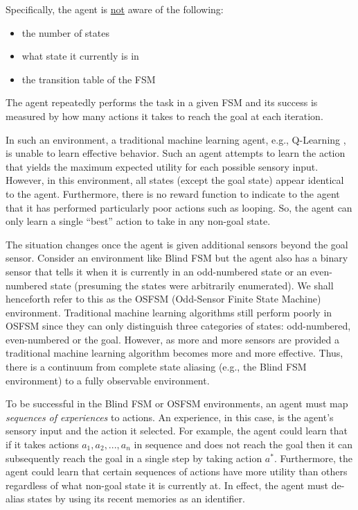 \documentclass[letterpaper]{article} %
\begin{document}
\bigskip  %

Specifically, the agent is \underline{not} aware of the following:
\begin{itemize}
\item the number of states
\item what state it currently is in
\item the transition table of the FSM
\end{itemize}

\noindent The agent repeatedly performs the task in a given FSM and its success
is measured by how many actions it takes to reach the goal at each
iteration.  

In such an environment, a traditional machine learning agent, e.g.,
Q-Learning \cite{Sutton98}, is unable to learn effective behavior.
Such an agent attempts to learn the action that yields the maximum
expected utility for each possible sensory input.  However, in this
environment, all states (except the goal state) appear identical to
the agent. Furthermore, there is no reward function to indicate to the
agent that it has performed particularly poor actions such as
looping. So, the agent can only learn a single ``best'' action to take
in any non-goal state.

The situation changes once the agent is given additional sensors
beyond the goal sensor.  Consider an environment like Blind FSM but
the agent also has a binary sensor that tells it when it is currently
in an odd-numbered state or an even-numbered state (presuming the
states were arbitrarily enumerated).  We shall henceforth refer to
this as the OSFSM (Odd-Sensor Finite State Machine)
environment. Traditional machine learning algorithms still perform
poorly in OSFSM since they can only distinguish three categories
of states: odd-numbered, even-numbered or the goal.  However, as more and
more sensors are provided a traditional machine learning algorithm
becomes more and more effective.  Thus, there is a continuum from
complete state aliasing (e.g., the Blind FSM environment) to a fully
observable environment.

To be successful in the Blind FSM or OSFSM environments, an agent must map
\textit{sequences of experiences} to actions. An experience, in this case,
is the agent's sensory input and the action it selected.  For
example, the agent could learn that if it takes actions $a_1, a_2, ..., a_n$ in
sequence and does not reach the goal then it can subsequently reach the goal in
a single step by taking action $a^*$.  Furthermore, the agent could learn that
certain sequences of actions have more utility than others regardless of what
non-goal state it is currently at. In effect, the agent must de-alias states by
using its recent memories as an identifier.
\end{document}
